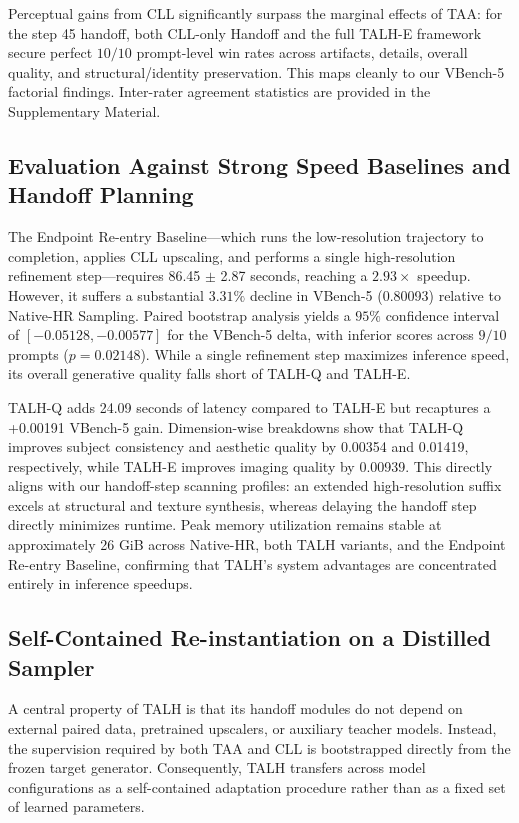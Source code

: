 Perceptual gains from CLL significantly surpass the marginal effects of
TAA: for the step 45 handoff, both CLL-only Handoff and the full TALH-E
framework secure perfect \(10/10\) prompt-level win rates across
artifacts, details, overall quality, and structural/identity
preservation. This maps cleanly to our VBench-5 factorial findings.
Inter-rater agreement statistics are provided in the Supplementary
Material.

\subsection{Evaluation Against Strong Speed Baselines and Handoff
Planning}

The Endpoint Re-entry Baseline---which runs the low-resolution
trajectory to completion, applies CLL upscaling, and performs a single
high-resolution refinement step---requires 86.45 \(\pm\) 2.87 seconds,
reaching a \(2.93\times\) speedup. However, it suffers a substantial
\(3.31\%\) decline in VBench-5 (0.80093) relative to Native-HR Sampling.
Paired bootstrap analysis yields a \(95\%\) confidence interval of
\([-0.05128, -0.00577]\) for the VBench-5 delta, with inferior scores
across \(9/10\) prompts (\(p=0.02148\)). While a single refinement step
maximizes inference speed, its overall generative quality falls short of
TALH-Q and TALH-E.

TALH-Q adds 24.09 seconds of latency compared to TALH-E but recaptures a
+0.00191 VBench-5 gain. Dimension-wise breakdowns show that TALH-Q
improves subject consistency and aesthetic quality by 0.00354 and
0.01419, respectively, while TALH-E improves imaging quality by 0.00939.
This directly aligns with our handoff-step scanning profiles: an
extended high-resolution suffix excels at structural and texture
synthesis, whereas delaying the handoff step directly minimizes runtime.
Peak memory utilization remains stable at approximately 26 GiB across
Native-HR, both TALH variants, and the Endpoint Re-entry Baseline,
confirming that TALH's system advantages are concentrated entirely in
inference speedups.

\subsection{Self-Contained Re-instantiation on a Distilled Sampler}

A central property of TALH is that its handoff modules do not
depend on external paired data, pretrained upscalers, or auxiliary
teacher models. Instead, the supervision required by both TAA and
CLL is bootstrapped directly from the frozen target generator.
Consequently, TALH transfers across model configurations as a
self-contained adaptation procedure rather than as a fixed set of
learned parameters.

